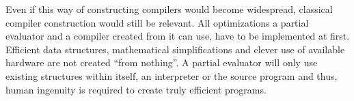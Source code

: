 Even if this way of constructing compilers would become widespread, classical compiler construction would still be relevant.
All optimizations a partial evaluator and a compiler created from it can use, have to be implemented at first.
Efficient data structures, mathematical simplifications and clever use of available hardware are not created \enquote{from nothing}.
A partial evaluator will only use existing structures within itself, an interpreter or the source program and thus, human ingenuity is required to create truly efficient programs.


